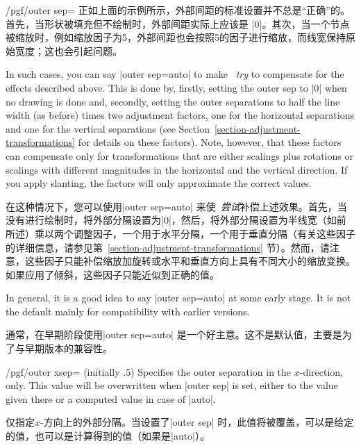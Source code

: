 \begin{key}{/pgf/outer sep=}
    正如上面的示例所示，外部间距的标准设置并不总是“正确”的。首先，当形状被填充但不绘制时，外部间距实际上应该是 |0|。其次，当一个节点被缩放时，例如缩放因子为5，外部间距也会按照5的因子进行缩放，而线宽保持原始宽度；这也会引起问题。

    In such cases, you can say |outer sep=auto| to make \tikzname\ \emph{try}
    to compensate for the effects described above. This is done by, firstly,
    setting the outer sep to |0| when no drawing is done and, secondly, setting
    the outer separations to half the line width (as before) times two
    adjustment factors, one for the horizontal separations and one for the
    vertical separations (see Section~\ref{section-adjustment-transformations}
    for details on these factors). Note, however, that these factors can
    compensate only for transformations that are either scalings plus rotations
    or scalings with different magnitudes in the horizontal and the vertical
    direction. If you apply slanting, the factors will only approximate the
    correct values.

    在这种情况下，您可以使用|outer sep=auto| 来使\tikzname\ \emph{尝试}补偿上述效果。首先，当没有进行绘制时，将外部分隔设置为|0|，然后，将外部分隔设置为半线宽（如前所述）乘以两个调整因子，一个用于水平分隔，一个用于垂直分隔（有关这些因子的详细信息，请参见第~\ref{section-adjustment-transformations} 节）。然而，请注意，这些因子只能补偿缩放加旋转或水平和垂直方向上具有不同大小的缩放变换。如果应用了倾斜，这些因子只能近似到正确的值。

    In general, it is a good idea to say |outer sep=auto| at some early stage.
    It is not the default mainly for compatibility with earlier versions.
    
    通常，在早期阶段使用|outer sep=auto| 是一个好主意。这不是默认值，主要是为了与早期版本的兼容性。

\begin{codeexample}[]
\end{codeexample}
\end{key}

\begin{key}{/pgf/outer xsep= (initially .5\string\pgflinewidth)}
    Specifies the outer separation in the $x$-direction, only. This value will
    be overwritten when |outer sep| is set, either to the value given there or
    a computed value in case of |auto|.

    仅指定$x$-方向上的外部分隔。当设置了|outer sep| 时，此值将被覆盖，可以是给定的值，也可以是计算得到的值（如果是|auto|）。
\end{key}

